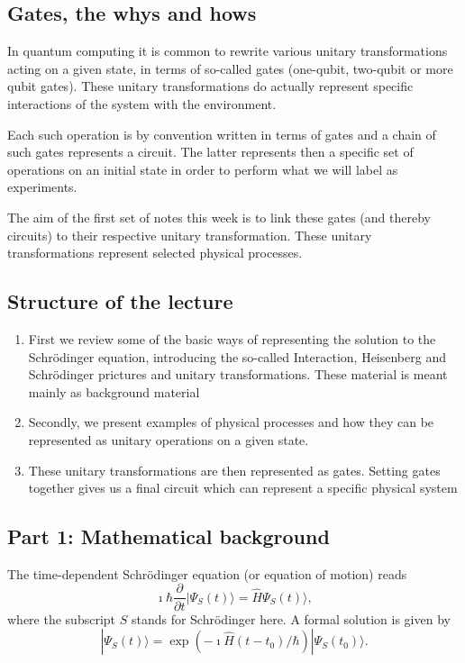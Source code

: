 \documentclass[%
oneside,                 %
final,                   %
10pt]{article}
\begin{document}
\subsection{Gates, the whys and hows}

In quantum computing it is common to rewrite various unitary
transformations acting on a given state, in terms of so-called gates
(one-qubit, two-qubit or more qubit gates). These unitary
transformations do actually represent specific interactions of the system with the
environment.

Each such operation is by convention written in terms of gates and a
chain of such gates represents a circuit. The latter represents then a
specific set of operations on an initial state in order to perform what we will label
as experiments.

The aim of the first set of notes this week is to link these gates
(and thereby circuits) to their respective unitary
transformation. These unitary transformations represent selected
physical processes. 

\subsection{Structure of the lecture}

\begin{enumerate}
\item First we review some of the basic ways of representing the solution to the Schrödinger equation, introducing the so-called Interaction, Heisenberg and Schrödinger prictures and unitary transformations. These material is meant mainly as background material

\item Secondly, we present examples of physical processes and how they can be represented as unitary operations on a given state.

\item These unitary transformations are then represented as gates. Setting gates together gives us a final circuit which can represent a specific physical system
\end{enumerate}

\noindent
\subsection{Part 1: Mathematical background}

The time-dependent Schrödinger equation (or equation of motion) reads
\[
\imath \hbar\frac{\partial }{\partial t}|\Psi_S(t)\rangle = \hat{H}\Psi_S(t)\rangle,
\]
where the subscript $S$ stands for Schrödinger here.
A formal solution is given by 
\[
|\Psi_S(t)\rangle = \exp{(-\imath\hat{H}(t-t_0)/\hbar)}|\Psi_S(t_0)\rangle.
\]
\end{document}
